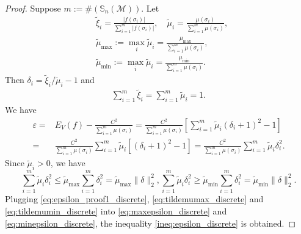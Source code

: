 \documentclass{article}
\begin{document}
\begin{proof}
Suppose $m:= \#(\mathbb{S}_n(\mathcal{M}))$. Let
\begin{align}
&\tilde{\xi}_i = \frac{|f(\sigma_i)|}{\sum_{i = 1}^m |f(\sigma_i)|},\quad
\tilde{\mu}_i = \frac{\mu(\sigma_i)}{\sum_{i = 1}^m\mu(\sigma_i)},\\
& \tilde{\mu}_{\text{max}} := \max_i \tilde{\mu}_{i} = \frac{\mu_{\text{max}}}{\sum_{i = 1}^m \mu(\sigma_i)}, \label{eq:tildemumax_discrete}\\
& \tilde{\mu}_{\text{min}} := \max_i \tilde{\mu}_{i} = \frac{\mu_{\text{min}}}{\sum_{i = 1}^m \mu(\sigma_i)}. \label{eq:tildemumin_discrete}
\end{align}
Then $\delta_i = {\tilde{\xi}_i}/{\tilde{\mu}_i} -1$ and
\begin{align}
    \sum_{i = 1}^m \tilde{\xi}_i = \sum_{i = 1}^m \tilde{\mu}_i = 1.
\end{align}
We have
\begin{align}
    \varepsilon = & E_V(f) - \frac{C^2}{\sum_{i = 1}^m \mu(\sigma_i)}
    = \frac{C^2}{\sum_{i = 1}^m\mu(\sigma_i)}  \left[ \sum_{i = 1}^m
    \tilde{\mu}_i(\delta_i + 1)^2 - 1 \right]\\
    = & \frac{C^2}{\sum_{i = 1}^m\mu(\sigma_i)} \sum_{i = 1}^m
    \tilde{\mu}_i[(\delta_i + 1)^2 - 1]
    = \frac{C^2}{\sum_{i = 1}^m\mu(\sigma_i)} \sum_{i = 1}^m
    \tilde{\mu}_i \delta_i^2.  \label{eq:epsilon_proof1_discrete}
\end{align}
Since $\tilde{\mu}_i > 0$, we have
\begin{subequations}
\begin{equation} \label{eq:maxepsilon_discrete}
\sum_{i = 1}^m
\tilde{\mu}_i\delta_i^2 \leq \tilde{\mu}_{\text{max}} \sum_{i = 1}^m \delta_i^2 = \tilde{\mu}_{\text{max}} \|\delta\|_2^2,
\end{equation}
\begin{equation} \label{eq:minepsilon_discrete}
\sum_{i = 1}^m \tilde{\mu}_i\delta_i^2 \geq \tilde{\mu}_{\text{min}} \sum_{i = 1}^m \delta_i^2 = \tilde{\mu}_{\text{min}} \|\delta\|_2^2.
\end{equation}
\end{subequations}
Plugging \eqref{eq:epsilon_proof1_discrete}, \eqref{eq:tildemumax_discrete} and \eqref{eq:tildemumin_discrete} into \eqref{eq:maxepsilon_discrete} and \eqref{eq:minepsilon_discrete}, the inequality \eqref{ineq:epsilon_discrete} is obtained.
\end{proof}
\end{document}
